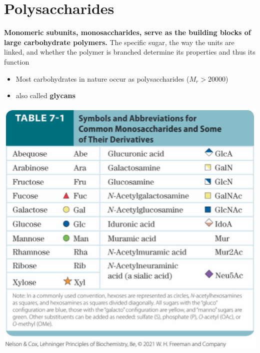 \documentclass[10pt]{article}
\begin{document}
\section*{Polysaccharides}
\textbf{Monomeric subunits, monosaccharides, serve as the building blocks of large carbohydrate polymers.}  The specific sugar, the way the units are linked, and whether the polymer is branched determine its properties and thus its function
\begin{itemize}
    \item Most carbohydrates in nature occur as polysaccharides ($M_r > 20000$)
    \item also called \textbf{glycans}
\end{itemize}
\begin{center}
    \includegraphics*[scale=0.8]{L1_15.png}
\end{center}
\end{document}
